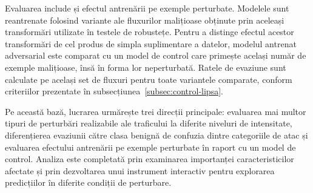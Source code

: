 Evaluarea include și efectul antrenării pe exemple perturbate. Modelele sunt reantrenate folosind variante ale fluxurilor malițioase obținute prin aceleași transformări utilizate în testele de robustețe. Pentru a distinge efectul acestor transformări de cel produs de simpla suplimentare a datelor, modelul antrenat adversarial este comparat cu un model de control care primește același număr de exemple malițioase, însă în forma lor neperturbată. Ratele de evaziune sunt calculate pe același set de fluxuri pentru toate variantele comparate, conform criteriilor prezentate în subsecțiunea~\ref{subsec:control-lipsa}.

Pe această bază, lucrarea urmărește trei direcții principale: evaluarea mai multor tipuri de perturbări realizabile ale traficului la diferite niveluri de intensitate, diferențierea evaziunii către clasa benignă de confuzia dintre categoriile de atac și evaluarea efectului antrenării pe exemple perturbate în raport cu un model de control. Analiza este completată prin examinarea importanței caracteristicilor afectate și prin dezvoltarea unui instrument interactiv pentru explorarea predicțiilor în diferite condiții de perturbare.

